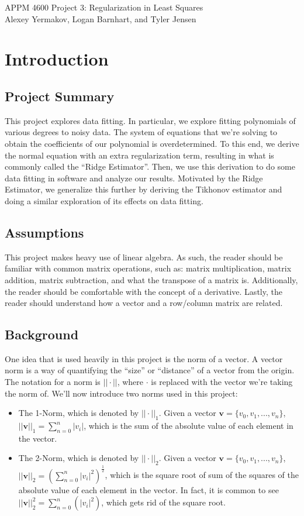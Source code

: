 \documentclass{article}
\newcommand{\V}{\mathbf{v}} %
\begin{document}
APPM 4600 Project 3: Regularization in Least Squares\\
Alexey Yermakov, Logan Barnhart, and Tyler Jensen

\section{Introduction}
\subsection{Project Summary}

This project explores data fitting. In particular, we explore fitting polynomials of various degrees to noisy data. The system of equations that we're solving to obtain the coefficients of our polynomial is overdetermined. To this end, we derive the normal equation with an extra regularization term, resulting in what is commonly called the ``Ridge Estimator''. Then, we use this derivation to do some data fitting in software and analyze our results. Motivated by the Ridge Estimator, we generalize this further by deriving the Tikhonov estimator and doing a similar exploration of its effects on data fitting.

\subsection{Assumptions}

This project makes heavy use of linear algebra. As such, the reader should be familiar with common matrix operations, such as: matrix multiplication, matrix addition, matrix subtraction, and what the transpose of a matrix is. Additionally, the reader should be comfortable with the concept of a derivative. Lastly, the reader should understand how a vector and a row/column matrix are related.

\subsection{Background}

One idea that is used heavily in this project is the norm of a vector. A vector norm is a way of quantifying the ``size'' or ``distance'' of a vector from the origin. The notation for a norm is $||\cdot||$, where $\cdot$ is replaced with the vector we're taking the norm of. We'll now introduce two norms used in this project:

\begin{itemize}
    \item The 1-Norm, which is denoted by $||\cdot||_1$. Given a vector $\V=\{v_0,v_1,...,v_n\}$, $||\V||_1=\sum_{n=0}^{n}|v_i|$, which is the sum of the absolute value of each element in the vector.
    \item The 2-Norm, which is denoted by $||\cdot||_2$. Given a vector $\V=\{v_0,v_1,...,v_n\}$, $||\V||_2=\left(\sum_{n=0}^{n}|v_i|^2\right)^{\frac{1}{2}}$, which is the square root of sum of the squares of the absolute value of each element in the vector. In fact, it is common to see $||\V||_2^{2}=\sum_{n=0}^{n}(|v_i|^2)$, which gets rid of the square root.
\end{itemize}
\end{document}
